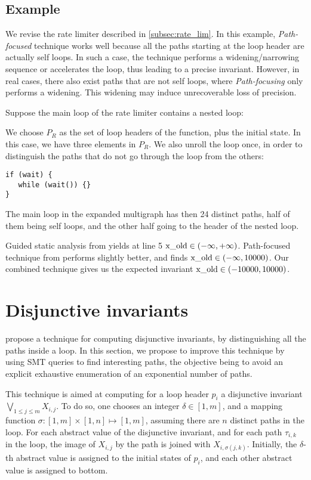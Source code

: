 \documentclass[preprint]{sigplanconf}
\begin{document}
\subsection{Example}

We revise the rate limiter described in \ref{subsec:rate_lim}. In this example,
\emph{Path-focused} technique works well because all the paths starting at the
loop header are actually self loops. In such a case, the technique performs a
widening/narrowing sequence or accelerates the loop, thus leading to a precise
invariant. However, in real cases, there also exist paths that are not
self loops, where \emph{Path-focusing} only performs a widening. 
This widening may induce unrecoverable loss of precision.

Suppose the main loop of the rate limiter contains a nested loop:


We choose $P_R$ as the set of loop headers of the function, plus the initial
state. In this case, we have three elements in $P_R$.
We also unroll the loop once, in order to distinguish the paths that do not go
through the loop from the others:
\begin{lstlisting}[numbers=none]
if (wait) {
   while (wait()) {}
}
\end{lstlisting}

The main loop in the expanded multigraph has then 24 distinct paths, half of
them being self loops, and the other half going to the header of the nested loop.

Guided static analysis from \citet{DBLP:conf/sas/GopanR07} yields at line 5 
$\lstinline|x_old| \in (-\infty,+\infty)$.
Path-focused technique from \citet{Monniaux_Gonnord_SAS11} performs slightly
better, and finds $\lstinline|x_old| \in (-\infty,10000)$.
Our combined technique gives us the expected invariant 
$\lstinline|x_old| \in (-10000,10000)$.

\section{Disjunctive invariants}
\label{sec:disjunctive}

\citet{DBLP:conf/pldi/GulwaniZ10} propose a technique for computing disjunctive invariants, by
distinguishing all the paths inside a loop. In
this section, we propose to improve this technique by using SMT queries to find
interesting paths, the objective being to avoid an explicit exhaustive
enumeration of an exponential number of paths.

This technique is aimed at computing for a loop header $p_i$ a disjunctive invariant
$\bigvee_{1\leq j \leq m} X_{i,j}$. 
To do so, one chooses an integer $\delta \in [1,m]$, and
a mapping function $\sigma: [1,m] \times [1,n] \mapsto [1,m]$, assuming there
are $n$ distinct paths in the loop.  For each
abstract value of the disjunctive invariant, and for each path $\tau_{i,k}$ in the loop, the
image of $X_{i,j}$ by the path is joined with
$X_{i,\sigma(j,k)}$.
Initially, the $\delta$-th abstract value is assigned to the initial states of
$p_i$, and each other abstract value is assigned to bottom.
\end{document}
